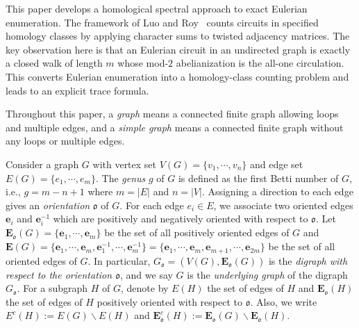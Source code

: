 \documentclass[11pt]{amsart}
\renewcommand{\setminus}{\mathbin{\backslash}}%
\theoremstyle{plain}
\theoremstyle{definition}
\newcommand{\mfrako}{{\mathfrak o}}
\newcommand{\ve}{{\mathbf e}}
\newcommand{\vE}{{\mathbf E}}
\numberwithin{equation}{section}
\begin{document}
This paper develops a homological spectral approach to exact Eulerian enumeration.  The framework of Luo and Roy~\cite{LR2024spectral} counts circuits in specified homology classes by applying character sums to twisted adjacency matrices.  The key observation here is that an Eulerian circuit in an undirected graph is exactly a closed walk of length $m$ whose mod-$2$ abelianization is the all-one circulation.  This converts Eulerian enumeration into a homology-class counting problem and leads to an explicit trace formula.



Throughout this paper, a \emph{graph} means a connected finite graph allowing loops and multiple edges, and  a \emph{simple graph} means a connected finite graph without any loops or multiple edges. 

Consider a graph $G$ with vertex set $V(G)=\{v_1,\cdots,v_n\}$ and edge set $E(G)=\{e_1,\cdots,e_m\}$. The \emph{genus} $g$ of $G$ is defined as the first Betti number of $G$, i.e., $g=m-n+1$ where $m=|E|$ and $n=|V|$.  Assigning a direction to each edge gives an \emph{orientation} $\mfrako$ of $G$. For each edge $e_i\in E$, we associate two oriented edges $\ve_i$ and $\ve_i^{-1}$ which are positively and negatively oriented with respect to $\mfrako$. Let $\vE_\mfrako(G) = \{\ve_1,\cdots,\ve_m\}$ be the set of all positively oriented edges of $G$ and  $\vE(G)= \{\ve_1,\cdots,\ve_m,\ve_1^{-1},\cdots,\ve_m^{-1}\}=\{\ve_1,\cdots,\ve_m,\ve_{m+1},\cdots,\ve_{2m}\}$ be the set of all oriented edges of $G$. In particular, $G_\mfrako = (V(G),\vE_\mfrako(G))$ is the \emph{digraph with respect to the orientation $\mfrako$}, and we say $G$ is the \emph{underlying graph} of the digraph $G_\mfrako$. For a subgraph $H$ of $G$, denote by $E(H)$ the set of edges of $H$ and $\vE_\mfrako(H)$ the set of edges of $H$ positively oriented with respect to $\mfrako$. Also, we write $E^c(H):=E(G)\setminus E(H)$ and $\vE^c_\mfrako(H):=\vE_\mfrako(G)\setminus \vE_\mfrako(H)$. 
\end{document}
